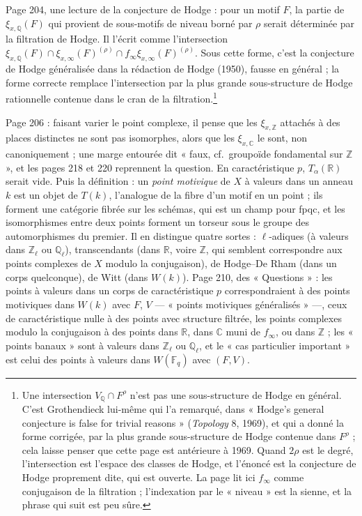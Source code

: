 \documentclass[11pt,a4paper]{article}
\begin{document}
Page 204, une lecture de la conjecture de Hodge : pour un motif $F$, la partie de
$\xi_{x,\mathbb{Q}}(F)$ qui provient de sous-motifs de niveau borné par $\rho$
serait déterminée par la filtration de Hodge. Il l'écrit comme l'intersection
$\xi_{x,\mathbb{Q}}(F) \cap \xi_{x,\infty}(F)^{(\rho)} \cap
f_{\infty}\xi_{x,\infty}(F)^{(\rho)}$. Sous cette forme, c'est la conjecture de
Hodge généralisée dans la rédaction de Hodge (1950), fausse en général ; la
forme correcte remplace l'intersection par la plus grande sous-structure de
Hodge rationnelle contenue dans le cran de la filtration.\footnote{Une
intersection $V_{\mathbb{Q}} \cap F^{\rho}$ n'est pas une sous-structure de Hodge
en général. C'est Grothendieck lui-même qui l'a remarqué, dans « Hodge's general
conjecture is false for trivial reasons » (\emph{Topology} 8, 1969), et qui a
donné la forme corrigée, par la plus grande sous-structure de Hodge contenue dans
$F^{\rho}$ ; cela laisse penser que cette page est antérieure à 1969. Quand
$2\rho$ est le degré, l'intersection est l'espace des classes de Hodge, et
l'énoncé est la conjecture de Hodge proprement dite, qui est ouverte. La page
lit ici $f_{\infty}$ comme conjugaison de la filtration ; l'indexation par le
« niveau » est la sienne, et la phrase qui suit est peu sûre.}

Page 206 : faisant varier le point complexe, il pense que les
$\xi_{x,\mathbb{Z}}$ attachés à des places distinctes ne sont pas isomorphes,
alors que les $\xi_{x,\mathbb{C}}$ le sont, non canoniquement ; une marge
entourée dit « faux, cf.\ groupoïde fondamental sur $\mathbb{Z}$ », et les pages
218 et 220 reprennent la question. En caractéristique $p$, $T_{\alpha}(\mathbb{R})$
serait vide. Puis la définition : un \emph{point motivique} de $X$ à valeurs dans
un anneau $k$ est un objet de $T(k)$, l'analogue de la fibre d'un motif en un
point ; ils forment une catégorie fibrée sur les schémas, qui est un champ pour
fpqc, et les isomorphismes entre deux points forment un torseur sous le groupe
des automorphismes du premier. Il en distingue quatre sortes : $\ell$-adiques (à
valeurs dans $\mathbb{Z}_{\ell}$ ou $\mathbb{Q}_{\ell}$), transcendants (dans
$\mathbb{R}$, voire $\mathbb{Z}$, qui semblent correspondre aux points complexes
de $X$ modulo la conjugaison), de Hodge--De Rham (dans un corps quelconque), de
Witt (dans $W(k)$). Page 210, des « Questions » : les points à valeurs dans un
corps de caractéristique $p$ correspondraient à des points motiviques dans $W(k)$
avec $F$, $V$ --- « points motiviques généralisés » ---, ceux de caractéristique
nulle à des points avec structure filtrée, les points complexes modulo la
conjugaison à des points dans $\mathbb{R}$, dans $\mathbb{C}$ muni de
$f_{\infty}$, ou dans $\mathbb{Z}$ ; les « points banaux » sont à valeurs dans
$\mathbb{Z}_{\ell}$ ou $\mathbb{Q}_{\ell}$, et le « cas particulier important »
est celui des points à valeurs dans $W(\mathbb{F}_{q})$ avec $(F, V)$.
\end{document}
